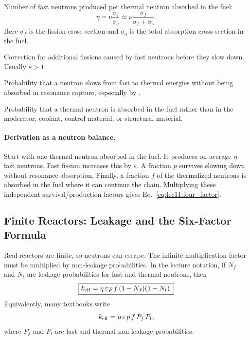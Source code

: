 \begin{description}[leftmargin=2.8cm,style=nextline]
  \item[$\eta$ --- reproduction factor]
  Number of fast neutrons produced per thermal neutron absorbed in the fuel:
  \begin{equation}
    \eta=\nu\frac{\sigma_f}{\sigma_a}
    \simeq \nu\frac{\sigma_f}{\sigma_f+\sigma_\gamma}.
    \label{eq:lec11:eta}
  \end{equation}
  Here $\sigma_f$ is the fission cross section and $\sigma_a$ is the total
  absorption cross section in the fuel.

  \item[$\varepsilon$ --- fast fission factor]
  Correction for additional fissions caused by fast neutrons before they slow
  down. Usually $\varepsilon>1$.

  \item[$p$ --- resonance escape probability]
  Probability that a neutron slows from fast to thermal energies without being
  absorbed in resonance capture, especially by .

  \item[$f$ --- thermal utilization factor]
  Probability that a thermal neutron is absorbed in the fuel rather than in the
  moderator, coolant, control material, or structural material.
\end{description}

\paragraph{Derivation as a neutron balance.}
Start with one thermal neutron absorbed in the fuel. It produces on average
$\eta$ fast neutrons. Fast fission increases this by $\varepsilon$. A fraction
$p$ survives slowing down without resonance absorption. Finally, a fraction $f$
of the thermalized neutrons is absorbed in the fuel where it can continue the
chain. Multiplying these independent survival/production factors gives
Eq.~\eqref{eq:lec11:four_factor}.

\subsection{Finite Reactors: Leakage and the Six-Factor Formula}
\label{subsec:lec11:six_factor}

Real reactors are finite, so neutrons can escape. The infinite multiplication
factor must be multiplied by non-leakage probabilities. In the lecture notation,
if $N_f$ and $N_t$ are leakage probabilities for fast and thermal neutrons, then
\begin{equation}
  \boxed{k_{\rm eff}
  =\eta\,\varepsilon\,p\,f\,(1-N_f)(1-N_t).}
  \label{eq:lec11:six_factor}
\end{equation}
Equivalently, many textbooks write
\begin{equation}
  k_{\rm eff}=\eta\,\varepsilon\,p\,f\,P_f\,P_t,
\end{equation}
where $P_f$ and $P_t$ are fast and thermal non-leakage probabilities.

